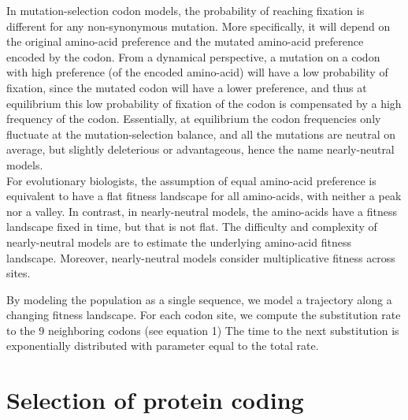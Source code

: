In mutation-selection codon models, the probability of reaching fixation is different for any non-synonymous mutation.
More specifically, it will depend on the original amino-acid preference and the mutated amino-acid preference encoded by the codon.
From a dynamical perspective, a mutation on a codon with high preference (of the encoded amino-acid) will have a low probability of fixation, since the mutated codon will have a lower preference, and thus at equilibrium this low probability of fixation of the codon is compensated by a high frequency of the codon.
Essentially, at equilibrium the codon frequencies only fluctuate at the mutation-selection balance, and all the mutations are neutral on average, but slightly deleterious or advantageous, hence the name nearly-neutral models.\\
For evolutionary biologists, the assumption of equal amino-acid preference is equivalent to have a flat fitness landscape for all amino-acids, with neither a peak nor a valley.
In contrast, in nearly-neutral models, the amino-acids have a fitness landscape fixed in time, but that is not flat.
The difficulty and complexity of nearly-neutral models are to estimate the underlying amino-acid fitness landscape.
Moreover, nearly-neutral models consider multiplicative fitness across sites.

By modeling the population as a single sequence, we model a trajectory along a changing fitness landscape.
For each codon site, we compute the substitution rate to the $9$ neighboring codons (see equation 1)  
The time to the next substitution is exponentially distributed with parameter equal to the total rate.

\section{Selection of protein coding}